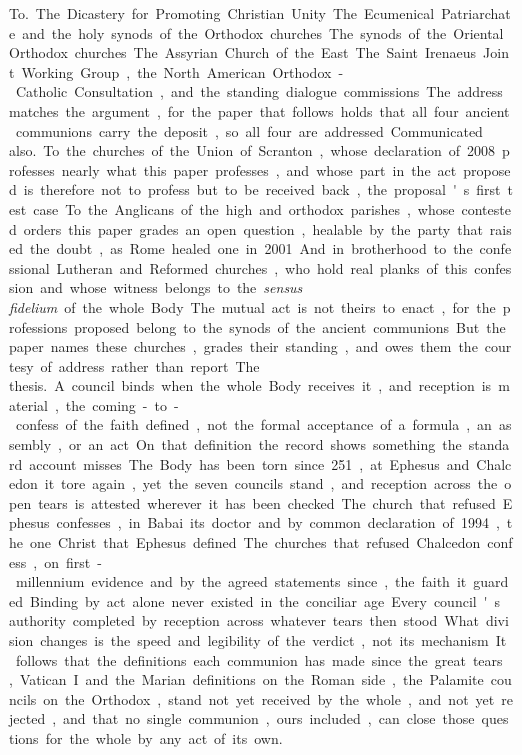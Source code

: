 \unit{To.}
The Dicastery for Promoting Christian Unity. The Ecumenical Patriarchate and the holy synods of the Orthodox churches. The synods of the Oriental Orthodox churches. The Assyrian Church of the East. The Saint Irenaeus Joint Working Group, the North American Orthodox-Catholic Consultation, and the standing dialogue commissions. The address matches the argument, for the paper that follows holds that all four ancient communions carry the deposit, so all four are addressed.

\unit{Communicated also.}
To the churches of the Union of Scranton, whose declaration of 2008 professes nearly what this paper professes, and whose part in the act proposed is therefore not to profess but to be received back, the proposal's first test case. To the Anglicans of the high and orthodox parishes, whose contested orders this paper grades an open question, healable by the party that raised the doubt, as Rome healed one in 2001. And in brotherhood to the confessional Lutheran and Reformed churches, who hold real planks of this confession and whose witness belongs to the \emph{sensus fidelium} of the whole Body. The mutual act is not theirs to enact, for the professions proposed belong to the synods of the ancient communions. But the paper names these churches, grades their standing, and owes them the courtesy of address rather than report.

\unit{The thesis.}
A council binds when the whole Body receives it, and reception is material, the coming-to-confess of the faith defined, not the formal acceptance of a formula, an assembly, or an act. On that definition the record shows something the standard account misses. The Body has been torn since 251, at Ephesus and Chalcedon it tore again, yet the seven councils stand, and reception across the open tears is attested wherever it has been checked. The church that refused Ephesus confesses, in Babai its doctor and by common declaration of 1994, the one Christ that Ephesus defined. The churches that refused Chalcedon confess, on first-millennium evidence and by the agreed statements since, the faith it guarded. Binding by act alone never existed in the conciliar age. Every council's authority completed by reception across whatever tears then stood. What division changes is the speed and legibility of the verdict, not its mechanism. It follows that the definitions each communion has made since the great tears, Vatican I and the Marian definitions on the Roman side, the Palamite councils on the Orthodox, stand not yet received by the whole, and not yet rejected, and that no single communion, ours included, can close those questions for the whole by any act of its own.

